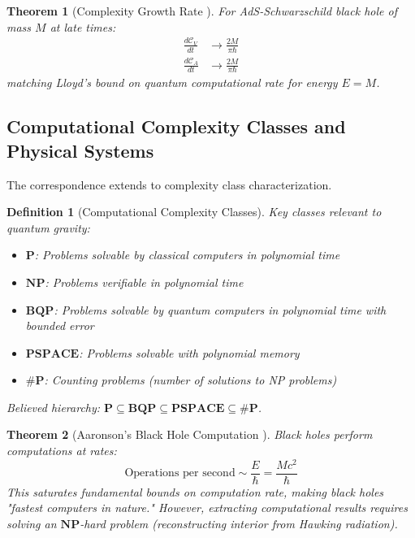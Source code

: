 \documentclass[11pt,a4paper]{article}
\newtheorem{theorem}{Theorem}[section]
\newtheorem{definition}{Definition}[section]
\theoremstyle{remark}
\theoremstyle{definition}
\begin{document}
\begin{theorem}[Complexity Growth Rate \cite{Brown2016}]
For AdS-Schwarzschild black hole of mass $M$ at late times:
\begin{align}
\frac{d\mathcal{C}_V}{dt} &\to \frac{2M}{\pi \hbar} \\
\frac{d\mathcal{C}_A}{dt} &\to \frac{2M}{\pi \hbar}
\end{align}
matching Lloyd's bound on quantum computational rate for energy $E = M$.
\end{theorem}

\subsection{Computational Complexity Classes and Physical Systems}

The correspondence extends to complexity class characterization.

\begin{definition}[Computational Complexity Classes]
Key classes relevant to quantum gravity:
\begin{itemize}
\item $\mathbf{P}$: Problems solvable by classical computers in polynomial time
\item $\mathbf{NP}$: Problems verifiable in polynomial time
\item $\mathbf{BQP}$: Problems solvable by quantum computers in polynomial time with bounded error
\item $\mathbf{PSPACE}$: Problems solvable with polynomial memory
\item $\mathbf{\# P}$: Counting problems (number of solutions to NP problems)
\end{itemize}
Believed hierarchy: $\mathbf{P} \subseteq \mathbf{BQP} \subseteq \mathbf{PSPACE} \subseteq \mathbf{\# P}$.
\end{definition}

\begin{theorem}[Aaronson's Black Hole Computation \cite{Aaronson2016}]
Black holes perform computations at rates:
\begin{equation}
\text{Operations per second} \sim \frac{E}{\hbar} = \frac{Mc^2}{\hbar}
\end{equation}
This saturates fundamental bounds on computation rate, making black holes "fastest computers in nature." However, extracting computational results requires solving an $\mathbf{NP}$-hard problem (reconstructing interior from Hawking radiation).
\end{theorem}
\end{document}
